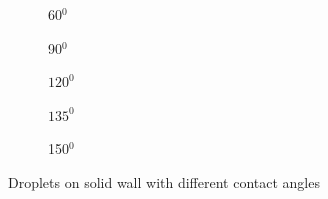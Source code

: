 \documentclass{article}
\begin{document}
\begin{figure}[h!]
 	\begin{subfigure}{3cm}
 		\caption{60$ ^{0} $}
 	\end{subfigure}
 	\begin{subfigure}[h!]{3cm}            
 		\caption{90$ ^{0} $}
 		\label{Fig:Datsa1}
 	\end{subfigure}
 	\begin{subfigure}[h!]{3cm}            
 		\caption{$ 120^{0} $}
 		\label{Fig:Datsase3}
 	\end{subfigure}
 	\begin{subfigure}[h!]{3cm}
 		\caption{$ 135^{0} $}
 	\end{subfigure}
 	\begin{subfigure}[h!]{3cm}
	 	\caption{150$ ^{0} $}
	\end{subfigure}
 	\caption{Droplets on solid wall with different contact angles }
 	\label{fig:spinods}
 \end{figure}
\end{document}
